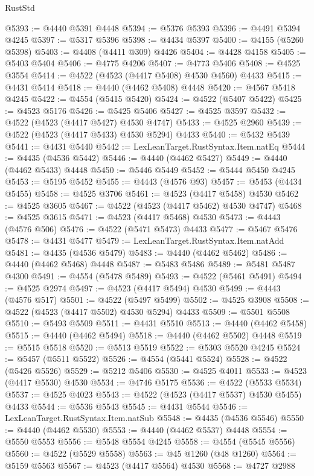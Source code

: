 \begin{lexlean}{RustStd}
\begin{coremodule}
{\begin{coremodule}
{{{{{{{{{{{{{{{{{{{{{{{{{{{{{{{{{{{{{{{{{{{{{{{{{{{{{{{{{{{{@5393 := @4440 @5391 @4448
@5394 := @5376 @5393
@5396 := @4491 @5394 @4245
@5397 := @5317 @5396
@5398 := @4434 @5397
@5400 := @4155 (@5260 @5398)
@5403 := @4408 (@4411 @309) @4426
@5404 := @4428 @4158
@5405 := @5403 @5404
@5406 := @4775 @4206
@5407 := @4773 @5406
@5408 := @4525 @3554
@5414 := @4522 (@4523 (@4417 @5408) @4530 @4560) @4433
@5415 := @4431 @5414
@5418 := @4440 (@4462 @5408) @4448
@5420 := @4567 @5418 @4245
@5422 := @4554 (@5415 @5420)
@5424 := @4522 (@5407 @5422)
@5425 := @4523 @5176
@5426 := @5425 @5406
@5427 := @4525 @3597
@5432 := @4522 (@4523 (@4417 @5427) @4530 @4747)
@5433 := @4525 @2960
@5439 := @4522 (@4523 (@4417 @5433) @4530 @5294) @4433
@5440 := @5432 @5439
@5441 := @4431 @5440
@5442 := LexLeanTarget.RustSyntax.Item.natEq
@5444 := @4435 (@4536 @5442)
@5446 := @4440 (@4462 @5427)
@5449 := @4440 (@4462 @5433) @4448
@5450 := @5446 @5449
@5452 := @5444 @5450 @4245
@5453 := @5195 @5452
@5455 := @4443 (@4576 @93)
@5457 := @5453 (@4434 @5455)
@5458 := @4525 @3706
@5461 := @4523 (@4417 @5458) @4530
@5462 := @4525 @3605
@5467 := @4522 (@4523 (@4417 @5462) @4530 @4747)
@5468 := @4525 @3615
@5471 := @4523 (@4417 @5468) @4530
@5473 := @4443 (@4576 @506)
@5476 := @4522 (@5471 @5473) @4433
@5477 := @5467 @5476
@5478 := @4431 @5477
@5479 := LexLeanTarget.RustSyntax.Item.natAdd
@5481 := @4435 (@4536 @5479)
@5483 := @4440 (@4462 @5462)
@5486 := @4440 (@4462 @5468) @4448
@5487 := @5483 @5486
@5489 := @5481 @5487 @4300
@5491 := @4554 (@5478 @5489)
@5493 := @4522 (@5461 @5491)
@5494 := @4525 @2974
@5497 := @4523 (@4417 @5494) @4530
@5499 := @4443 (@4576 @517)
@5501 := @4522 (@5497 @5499)
@5502 := @4525 @3908
@5508 := @4522 (@4523 (@4417 @5502) @4530 @5294) @4433
@5509 := @5501 @5508
@5510 := @5493 @5509
@5511 := @4431 @5510
@5513 := @4440 (@4462 @5458)
@5515 := @4440 (@4462 @5494)
@5518 := @4440 (@4462 @5502) @4448
@5519 := @5515 @5518
@5520 := @5513 @5519
@5522 := @5303 @5520 @4245
@5524 := @5457 (@5511 @5522)
@5526 := @4554 (@5441 @5524)
@5528 := @4522 (@5426 @5526)
@5529 := @5212 @5406
@5530 := @4525 @4011
@5533 := @4523 (@4417 @5530) @4530
@5534 := @4746 @5175
@5536 := @4522 (@5533 @5534)
@5537 := @4525 @4023
@5543 := @4522 (@4523 (@4417 @5537) @4530 @5455) @4433
@5544 := @5536 @5543
@5545 := @4431 @5544
@5546 := LexLeanTarget.RustSyntax.Item.natSub
@5548 := @4435 (@4536 @5546)
@5550 := @4440 (@4462 @5530)
@5553 := @4440 (@4462 @5537) @4448
@5554 := @5550 @5553
@5556 := @5548 @5554 @4245
@5558 := @4554 (@5545 @5556)
@5560 := @4522 (@5529 @5558)
@5563 := @45 @1260 (@48 @1260)
@5564 := @5159 @5563
@5567 := @4523 (@4417 @5564) @4530
@5568 := @4727 @2988
}}}}}}}}}}}}}}}}}}}}}}}}}}}}}}}}}}}}}}}}}}}}}}}}}}}}}}}}}}}}
\end{coremodule}}
\end{coremodule}
\end{lexlean}
